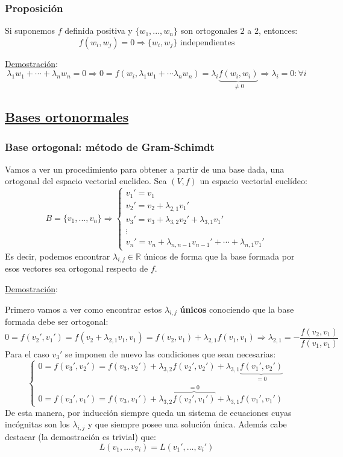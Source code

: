 \documentclass[10pt,a4paper,openright]{book}
\begin{document}
\subsubsection*{Proposición}
Si suponemos $f$ definida positiva y $\{w_1, ..., w_n\}$ son ortogonales $2$ a $2$, entonces:
$$f(w_i,w_j) = 0\Rightarrow \{w_i, w_j\} \mbox{ independientes}$$

\underline{Demostración}:
$$\lambda_1w_1+\cdots+\lambda_nw_n = 0 \Rightarrow 0 = f(w_i, \lambda_1w_1+\cdots \lambda_nw_n) = \lambda_i\underbrace{f(w_i,w_i)}_{\neq 0}\Rightarrow\lambda_i = 0: \forall i$$

\subsection*{\underline{Bases ortonormales}}
\subsubsection*{Base ortogonal: método de Gram-Schimdt}
Vamos a ver un procedimiento para obtener a partir de una base dada, una ortogonal del espacio vectorial euclideo. Sea $(V,f)$ un espacio vectorial euclídeo:
$$B=\{v_1, ..., v_n\}\Rightarrow \begin{cases} v_1' = v_1  \\ v_2' = v_2 + \lambda_{2,1}v_1' \\ v_3' = v_3 + \lambda_{3,2}v_2' + \lambda_{3,1}v_1' \\ \vdots \\ v_n' = v_n + \lambda_{n,n-1}v_{n-1}'+\cdots + \lambda_{n,1}v_1'\end{cases}$$
Es decir, podemos encontrar $\lambda_{i,j}\in \mathbb R$ únicos de forma que la base formada por esos vectores sea ortogonal respecto de $f$.

\underline{Demostración}:

Primero vamos a ver como encontrar estos $\lambda_{i,j}$ \textbf{únicos} conociendo que la base formada debe ser ortogonal:
$$0 = f(v_2',v_1') = f(v_2+\lambda_{2,1}v_1, v_1) = f(v_2,v_1)+\lambda_{2,1}f(v_1,v_1)\Rightarrow \lambda_{2,1} = -\frac{f(v_2,v_1)}{f(v_1,v_1)}$$
Para el caso $v_3'$ se imponen de nuevo las condiciones que sean necesarias:
$$\begin{cases} 0=f(v_3',v_2') = f(v_3,v_2')+\lambda_{3,2}f(v_2',v_2')+\lambda_{3,1}\underbrace{f(v_1',v_2')}_{=0} \\ 0 = f(v_3', v_1') = f(v_3, v_1')+ \lambda_{3,2}\overbrace{f(v_2',v_1')}^{=0}+\lambda_{3,1}f(v_1',v_1') \end{cases}$$
De esta manera, por inducción siempre queda un sistema de ecuaciones cuyas incógnitas son los $\lambda_{i,j}$ y que siempre posee una solución única. Además cabe destacar (la demostración es trivial) que:
$$L(v_1, \ldots, v_i) = L(v_1', \ldots, v_i')$$
\end{document}
